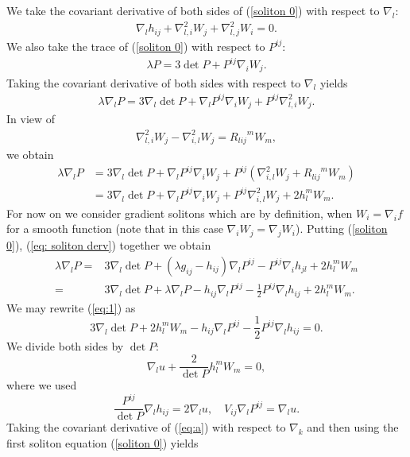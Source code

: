 \documentclass{amsart}
\theoremstyle{definition}
\theoremstyle{remark}
\numberwithin{equation}{section}
\begin{document}
We take the covariant derivative of both sides of (\ref{soliton 0}) with respect to $\nabla_l:$
\begin{align}\label{eq: soliton derv}
\nabla_lh_{ij}+\nabla^2_{l,i}W_j+\nabla^2_{l,j}W_i=0.
\end{align}
We also take the trace of (\ref{soliton 0}) with respect to $P^{ij}$:
\begin{align}\label{trace}
\lambda P=3\det P+P^{ij}\nabla_iW_j.
\end{align}
Taking the covariant derivative of both sides with respect to $\nabla_l$ yields
\begin{align*}
\lambda \nabla_l P=3\nabla_l\det P+\nabla_l P^{ij}\nabla_iW_j+P^{ij}\nabla^2_{l,i}W_j.
\end{align*}
In view of
\begin{align*}
\nabla^2_{l,i}W_j-\nabla^2_{i,l}W_j={R_{lij}}^mW_m,
\end{align*}
we obtain
\begin{align}\label{equ00}
\lambda \nabla_l P&=3\nabla_l\det P+\nabla_l P^{ij}\nabla_iW_j+P^{ij}(\nabla^2_{i,l}W_j+{R_{lij}}^mW_m)\\
&=3\nabla_l\det P+\nabla_l P^{ij}\nabla_iW_j+P^{ij}\nabla^2_{i,l}W_j+2h_l^mW_m.\nonumber
\end{align}
For now on  we consider gradient solitons which are by definition, when $W_i=\nabla_if$ for a smooth function (note that in this case $\nabla_iW_j=\nabla_jW_i$).
Putting (\ref{soliton 0}), (\ref{eq: soliton derv}) together we obtain
\begin{align}\label{eq:1}
\lambda \nabla_l P
=&3\nabla_l\det P+(\lambda g_{ij}-h_{ij})\nabla_l P^{ij}-P^{ij}\nabla_ih_{jl}+2h_l^mW_m\\
=&3\nabla_l\det P+\lambda \nabla_l P-h_{ij}\nabla_l P^{ij}-\frac{1}{2}P^{ij}\nabla_lh_{ij}+2h_l^mW_m.\nonumber
\end{align}
We may rewrite (\ref{eq:1}) as
\[3\nabla_l\det P+2h_l^mW_m-h_{ij}\nabla_l P^{ij}-\frac{1}{2}P^{ij}\nabla_lh_{ij}=0.\]
We divide both sides by $\det P:$
\begin{equation}\label{eq:a}
\nabla_lu+\frac{2}{\det P}h_l^mW_m=0,
\end{equation}
where we used
\begin{equation}\label{eq0}
\frac{P^{ij}}{\det P}\nabla_lh_{ij}=2\nabla_lu,\quad V_{ij}\nabla_lP^{ij}=\nabla_lu.
\end{equation}
Taking the covariant derivative of (\ref{eq:a}) with respect to $\nabla_k$ and then using the first soliton equation (\ref{soliton 0}) yields
\end{document}
